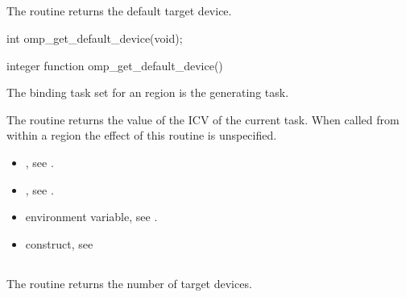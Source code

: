\subsection{}
\label{subsec:omp_get_default_device}
\summary
The  routine returns the default target device.

\format
\begin{ccppspecific}
\begin{ompcFunction}
int omp_get_default_device(void);
\end{ompcFunction}
\end{ccppspecific}

\begin{fortranspecific}
\begin{ompfFunction}
integer function omp_get_default_device()
\end{ompfFunction}
\end{fortranspecific}

\binding
The binding task set for an  region is the generating
task.

\effect
The  routine returns the value of the 
ICV of the current task. When called from within a  region the effect of this
routine is unspecified.

\crossreferences
\begin{itemize}

\item {}, see
.

\item {}, see
.

\item {} environment variable, see
.

\item {} construct, see

\end{itemize}











\subsection{}
\label{subsec:omp_get_num_devices}
\summary
The  routine returns the number of target devices.


